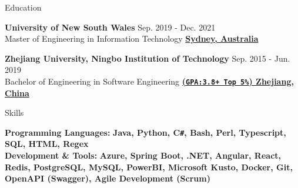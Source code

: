 \documentclass[a4paper]{resume} %
\begin{document}

\begin{rSection}{\large Education}

{\bf University of New South Wales} \hfill { Sep. 2019 - Dec. 2021}
\\Master of Engineering in Information Technology \hfill {\textbf{\underline{Sydney, Australia}}}



{\bf Zhejiang University, Ningbo Institution of Technology} \hfill { Sep. 2015 - Jun. 2019}
\\Bachelor of Engineering in Software Engineering \hfill {\textbf{\underline{(\texttt{GPA:3.8+ Top 5\%}) Zhejiang, China}}}

\end{rSection}




\begin{rSection}{\large Skills}

\textbf{Programming Languages:}             \hfill  \textbf{Java, Python, C\texttt{\#}, Bash, Perl, Typescript, SQL, HTML, Regex} \\
\textbf{Development \& Tools:}   \hfill  \textbf{Azure, Spring Boot, .NET, Angular, React, Redis, PostgreSQL, MySQL, PowerBI, Microsoft Kusto, Docker, Git, OpenAPI (Swagger), Agile Development (Scrum) }\\

\end{rSection}


\end{document}
